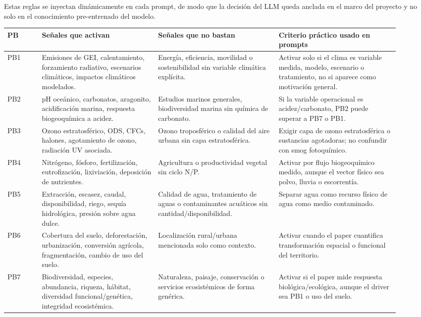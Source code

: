 Estas reglas se inyectan dinámicamente en cada prompt, de modo que la decisión del LLM queda anclada en el marco del proyecto y no solo en el conocimiento pre-entrenado del modelo.

\begin{center}
\scriptsize
\setlength{\tabcolsep}{4pt}
\renewcommand{\arraystretch}{1.18}
\begin{tabular}{p{0.08\linewidth}p{0.27\linewidth}p{0.28\linewidth}p{0.29\linewidth}}
\toprule
PB & Señales que activan & Señales que no bastan & Criterio práctico usado en prompts \\
\midrule
PB1 & Emisiones de GEI, calentamiento, forzamiento radiativo, escenarios climáticos, impactos climáticos modelados. & Energía, eficiencia, movilidad o sostenibilidad sin variable climática explícita. & Activar solo si el clima es variable medida, modelo, escenario o tratamiento, no si aparece como motivación general. \\
PB2 & pH oceánico, carbonatos, aragonito, acidificación marina, respuesta biogeoquímica a acidez. & Estudios marinos generales, biodiversidad marina sin química de carbonato. & Si la variable operacional es acidez/carbonato, PB2 puede superar a PB7 o PB1. \\
PB3 & Ozono estratosférico, ODS, CFCs, halones, agotamiento de ozono, radiación UV asociada. & Ozono troposférico o calidad del aire urbana sin capa estratosférica. & Exigir capa de ozono estratosférica o sustancias agotadoras; no confundir con smog fotoquímico. \\
PB4 & Nitrógeno, fósforo, fertilización, eutrofización, lixiviación, deposición de nutrientes. & Agricultura o productividad vegetal sin ciclo N/P. & Activar por flujo biogeoquímico medido, aunque el vector físico sea polvo, lluvia o escorrentía. \\
PB5 & Extracción, escasez, caudal, disponibilidad, riego, sequía hidrológica, presión sobre agua dulce. & Calidad de agua, tratamiento de aguas o contaminantes acuáticos sin cantidad/disponibilidad. & Separar agua como recurso físico de agua como medio contaminado. \\
PB6 & Cobertura del suelo, deforestación, urbanización, conversión agrícola, fragmentación, cambio de uso del suelo. & Localización rural/urbana mencionada solo como contexto. & Activar cuando el paper cuantifica transformación espacial o funcional del territorio. \\
PB7 & Biodiversidad, especies, abundancia, riqueza, hábitat, diversidad funcional/genética, integridad ecosistémica. & Naturaleza, paisaje, conservación o servicios ecosistémicos de forma genérica. & Activar si el paper mide respuesta biológica/ecológica, aunque el driver sea PB1 o uso del suelo. \\

\end{tabular}
\end{center}
